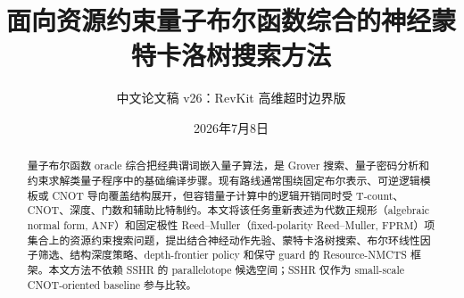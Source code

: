 \documentclass[UTF8,fontset=macnew,11pt]{ctexart}
\title{面向资源约束量子布尔函数综合的神经蒙特卡洛树搜索方法}
\author{中文论文稿 v26：RevKit 高维超时边界版}
\date{2026年7月8日}
\newcommand{\method}{Resource-NMCTS}
\newcommand{\anf}{\ensuremath{\mathrm{ANF}}}
\newcommand{\fprm}{\ensuremath{\mathrm{FPRM}}}
\begin{document}
\pagestyle{plain}
\maketitle

\begin{abstract}
量子布尔函数 oracle 综合把经典谓词嵌入量子算法，是 Grover 搜索、量子密码分析和约束求解类量子程序中的基础编译步骤。现有路线通常围绕固定布尔表示、可逆逻辑模板或 CNOT 导向覆盖结构展开，但容错量子计算中的逻辑开销同时受 T-count、CNOT、深度、门数和辅助比特制约。本文将该任务重新表述为代数正规形（algebraic normal form, \anf{}）和固定极性 Reed--Muller（fixed-polarity Reed--Muller, \fprm{}）项集合上的资源约束搜索问题，提出结合神经动作先验、蒙特卡洛树搜索、布尔环线性因子筛选、结构深度策略、depth-frontier policy 和保守 guard 的 \method{} 框架。本文方法不依赖 SSHR 的 parallelotope 候选空间；SSHR 仅作为 small-scale CNOT-oriented baseline 参与比较。


\end{abstract}
\end{document}
